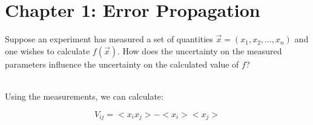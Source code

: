 \section{Chapter 1: Error Propagation}

Suppose an experiment has measured a set of quantities $\vec{x} = (x_1, x_2, ..., x_n)$ and one wishes to calculate $f(\vec{x})$.  How does the uncertainty on the measured parameters influence the uncertainty on the calculated value of $f$? 

\\
Using the measurements, we can calculate: 

\begin{equation}
	V_{ij} = <x_i x_j> - <x_i><x_j>
\end{equation}
	